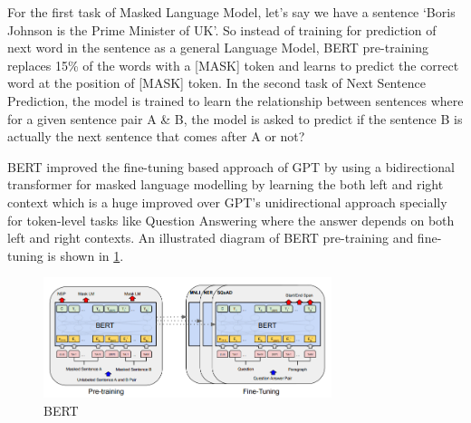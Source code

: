 For the first task of Masked Language Model, let’s say we have a sentence ‘Boris Johnson is the Prime Minister of UK’. So instead of training for prediction of next word in the sentence as a general Language Model, BERT pre-training replaces 15\% of the words with a [MASK] token and learns to predict the correct word at the position of [MASK] token. In the second task of Next Sentence Prediction, the model is trained to learn the relationship between sentences where for a given sentence pair A \& B, the model is asked to predict if the sentence B is actually the next sentence that comes after A or not?

BERT improved the fine-tuning based approach of GPT by using a bidirectional transformer for masked language modelling by learning the both left and right context which is a huge improved over GPT's unidirectional approach specially for token-level tasks like Question Answering where the answer depends on both left and right contexts. An illustrated diagram of BERT pre-training and fine-tuning is shown in \cref{fig:bert1}. 

\begin{figure}
    \centering
    \includegraphics[width=0.75\textwidth]{images/bert1.png}
    \caption{BERT \cite{devlin2018bert}}
    \label{fig:bert1}
\end{figure}



